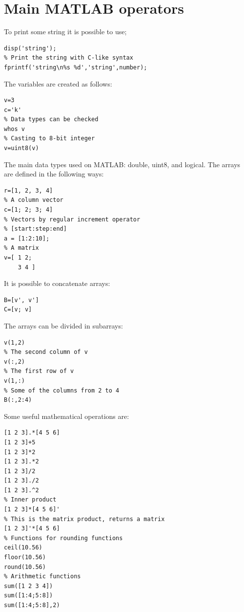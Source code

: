 \documentclass[12pt, a4paper]{report}
\begin{document}
    \section{Main MATLAB operators}
    To print some string it is possible to use; 
    \begin{lstlisting}[style=Matlab]
% Print the string
disp('string');
% Print the string with C-like syntax
fprintf('string\n%s %d','string',number);
    \end{lstlisting}
    The variables are created as follows: 
    \begin{lstlisting}[style=Matlab]
% Variables are created by assignements
v=3
c='k'
% Data types can be checked
whos v
% Casting to 8-bit integer
v=uint8(v)
    \end{lstlisting}
    The main data types used on MATLAB: double, uint8, and logical. The arrays are defined in the following ways: 
    \begin{lstlisting}[style=Matlab]
% A row vector
r=[1, 2, 3, 4]
% A column vector
c=[1; 2; 3; 4]
% Vectors by regular increment operator
% [start:step:end]
a = [1:2:10];
% A matrix
v=[ 1 2; 
    3 4 ]
    \end{lstlisting}
    It is possible to concatenate arrays: 
    \begin{lstlisting}[style=Matlab]
B=[v', v']
C=[v; v]        
    \end{lstlisting}
    The arrays can be divided in subarrays: 
    \begin{lstlisting}[style=Matlab]
% First row and second column 
v(1,2) 
% The second column of v
v(:,2)
% The first row of v
v(1,:) 
% Some of the columns from 2 to 4
B(:,2:4) 
    \end{lstlisting}
    Some useful mathematical operations are: 
    \begin{lstlisting}[style=Matlab]
% . means elementwise operation
[1 2 3].*[4 5 6]
[1 2 3]+5
[1 2 3]*2 
[1 2 3].*2 
[1 2 3]/2
[1 2 3]./2 
[1 2 3].^2 
% Inner product
[1 2 3]*[4 5 6]' 
% This is the matrix product, returns a matrix
[1 2 3]'*[4 5 6] 
% Functions for rounding functions
ceil(10.56)
floor(10.56)
round(10.56)
% Arithmetic functions
sum([1 2 3 4])
sum([1:4;5:8])
sum([1:4;5:8],2)
    \end{lstlisting}
\end{document}
